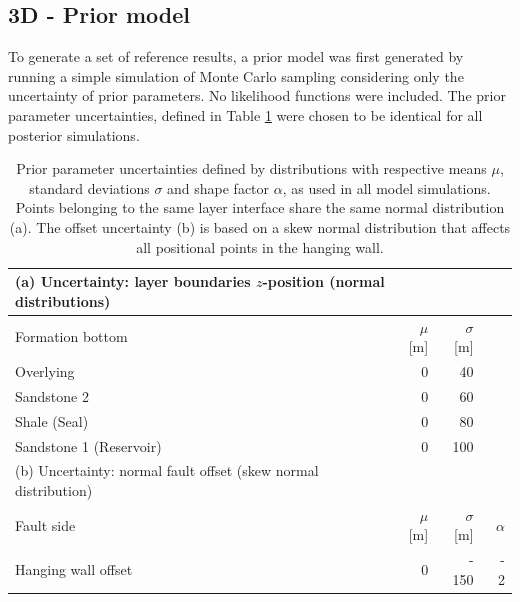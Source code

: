 		\subsection{3D - Prior model}\label{sec:prior_model3D}
		To generate a set of reference results, a prior model was first generated by running a simple simulation of Monte Carlo sampling considering only the uncertainty of prior parameters. No likelihood functions were included. The prior parameter uncertainties, defined in Table \ref{tab:3D_prior_parameters} were chosen to be identical for all posterior simulations.
		\begin{table}[h]
		\centering
		\begin{tabular}{lrrr} 
			\toprule
			(a) Uncertainty: layer boundaries $z$-position (normal distributions)\\  
			\midrule 
			Formation bottom & $\mu$ [m] & $\sigma$ [m]\\ 
			\midrule 
			Overlying & 0 & 40 \\
			Sandstone 2 & 0 & 60 \\
			Shale (Seal) & 0 & 80\\ 
			Sandstone 1 (Reservoir) & 0 & 100 \\
			\bottomrule
			\toprule
			(b) Uncertainty: normal fault offset (skew normal distribution)\\
			\midrule
			Fault side & $\mu$ [m] & $\sigma$ [m] & $\alpha$\\
			\midrule
			Hanging wall offset & 0 & -~150 & -~2\\
			\bottomrule 
		\end{tabular}
		\caption{Prior parameter uncertainties defined by distributions with respective means $\mu$, standard deviations $\sigma$ and shape factor $\alpha$, as used in all model simulations. Points belonging to the same layer interface share the same normal distribution (a). The offset uncertainty (b) is based on a skew normal distribution that affects all positional points in the hanging wall.}
		\label{tab:3D_prior_parameters}
		\end{table}
